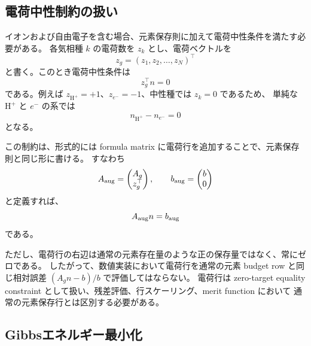 \subsection*{電荷中性制約の扱い}
  イオンおよび自由電子を含む場合、元素保存則に加えて電荷中性条件を満たす必要がある。
  各気相種 $k$ の電荷数を $z_k$ とし、電荷ベクトルを
  \[
    z_g = (z_1, z_2, \ldots, z_N)^\top
  \]
  と書く。このとき電荷中性条件は
  \[
    z_g^\top n = 0
  \]
  である。例えば $z_{\mathrm{H}^+}=+1$、$z_{e^-}=-1$、中性種では $z_k=0$ であるため、
  単純な $\mathrm{H}^+$ と $e^-$ の系では
  \[
    n_{\mathrm{H}^+} - n_{e^-} = 0
  \]
  となる。

  この制約は、形式的には formula matrix に電荷行を追加することで、元素保存則と同じ形に書ける。
  すなわち
  \[
    A_{\rm aug}
    =
    \begin{pmatrix}
      A_g \\
      z_g^\top
    \end{pmatrix},
    \qquad
    b_{\rm aug}
    =
    \begin{pmatrix}
      b \\
      0
    \end{pmatrix}
  \]
  と定義すれば、
  \[
    A_{\rm aug} n = b_{\rm aug}
  \]
  である。

  ただし、電荷行の右辺は通常の元素存在量のような正の保存量ではなく、常にゼロである。
  したがって、数値実装において電荷行を通常の元素 budget row と同じ相対誤差
  $(A_g n - b)/b$ で評価してはならない。
  電荷行は zero-target equality constraint として扱い、残差評価、行スケーリング、merit function において
  通常の元素保存行とは区別する必要がある。

\subsection*{Gibbsエネルギー最小化}

